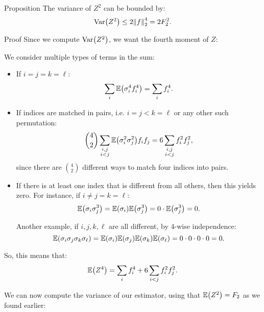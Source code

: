 \documentclass[a4paper]{article}
\begin{document}
\begin{parag}{Proposition}
    The variance of $Z^2$ can be bounded by:
    \[\Var\left(Z^2\right) \leq 2 \left\|f\right\|_2^4 = 2 F_2^2.\]

    \begin{subparag}{Proof}
        Since we compute $\Var\left(Z^2\right)$, we want the fourth moment of $Z$: 

        We consider multiple types of terms in the sum:
        \begin{itemize}
            \item If $i = j = k = \ell$: 
            \[\sum_{i} \exval\left(\sigma_i^4 f_i^4\right) = \sum_{i} f_i^4.\]
            \item If indices are matched in pairs, i.e. $i = j < k = \ell$ or any other such permutation:  
            \[\binom{4}{2} \sum_{\substack{i, j \\ i < j}} \exval\left(\sigma_i^2 \sigma_j^2\right) f_i f_j = 6 \sum_{\substack{i, j \\ i < j}} f_i^2 f_j^2,\]
            since there are $\binom{4}{2}$ different ways to match four indices into pairs.
            \item If there is at least one index that is different from all others, then this yields zero. For instance, if $i \neq j = k = \ell$: 
            \[\exval\left(\sigma_i \sigma_j^3\right) = \exval\left(\sigma_i\right) \exval\left(\sigma_j^3\right) = 0\cdot \exval\left(\sigma_j^3\right) = 0.\]

            Another example, if $i, j, k, \ell$ are all different, by 4-wise independence: 
            \[\exval\left(\sigma_i \sigma_j \sigma_k \sigma_{\ell}\right) = \exval\left(\sigma_i\right) \exval\left(\sigma_j\right) \exval\left(\sigma_k\right) \exval\left(\sigma_{\ell}\right) = 0\cdot 0\cdot 0\cdot 0 = 0.\]
        \end{itemize}
        
        So, this means that: 
        \[\exval\left(Z^4\right) = \sum_{i} f_i^4 + 6 \sum_{i < j} f_i^2 f_j^2.\]
        
        We can now compute the variance of our estimator, using that $\exval\left(Z^2\right) = F_2$ as we found earlier: 


\end{subparag}
\end{parag}
\end{document}
